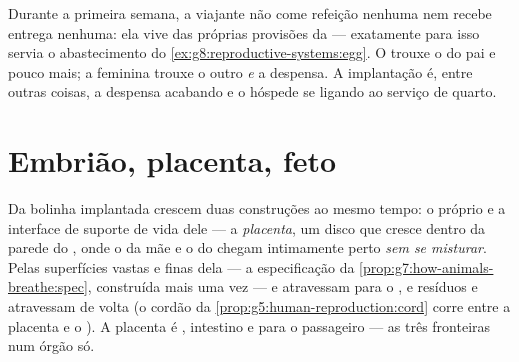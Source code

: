 \begin{example}\label{ex:g8:from-egg-to-birth:provisions}
Durante a primeira semana, a viajante não come refeição nenhuma nem
recebe entrega nenhuma: ela vive das próprias provisões da  --- exatamente para isso servia o abastecimento do
\cref{ex:g8:reproductive-systems:egg}. O  trouxe o
 do pai e pouco mais; a  feminina trouxe o outro 
\emph{e} a despensa. A implantação é, entre outras coisas, a despensa
acabando e o hóspede se ligando ao serviço de quarto.
\end{example}

\section{Embrião, placenta, feto}

\begin{definition}[A placenta]\label{def:g8:from-egg-to-birth:placenta}
Da bolinha implantada crescem duas construções ao mesmo tempo: o
próprio \emph{} e a interface de suporte de vida dele --- a
\emph{placenta}, um disco que cresce dentro da parede
do , onde o  da mãe e o  do  chegam
intimamente perto \emph{sem se misturar}. Pelas superfícies vastas e
finas dela --- a especificação da
\cref{prop:g7:how-animals-breathe:spec}, construída mais uma vez ---
 e  atravessam para o , e resíduos e  atravessam de volta (o cordão da
\cref{prop:g5:human-reproduction:cord} corre entre a placenta e o
). A placenta é , intestino e  para o passageiro ---
as três fronteiras num órgão só.
\end{definition}


